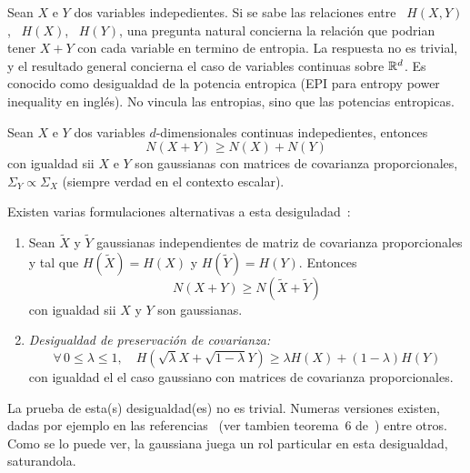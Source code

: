 

Sean $X$  e $Y$ dos variables indepedientes.  Si se sabe las  relaciones entre \
$H(X,Y)$, \ $H(X)$,  \ $H(Y)$, una pregunta natural  concierna la relaci\'on que
podrian tener $X+Y$ con cada variable en termino de entropia. La respuesta no es
trivial, y el  resultado general concierna el caso  de variables continuas sobre
$\mathbb{R}^d$.   Es conocido  como desigualdad  de la  potencia entropica  (EPI para
entropy power  inequality en ingl\'es). No  vincula las entropias,  sino que las
potencias entropicas.
%
\begin{teorema}
  Sean  $X$  e  $Y$  dos variables  $d$-dimensionales  continuas  indepedientes,
  entonces
  \[
  N(X + Y) \ge N(X) + N(Y)
  \]
%
  con  igualdad  sii  $X$  e  $Y$  son gaussianas  con  matrices  de  covarianza
  proporcionales,  $\Sigma_Y \propto  \Sigma_X$ (siempre  verdad en  el contexto
  escalar).
\end{teorema}
%
\noindent     Existen    varias     formulaciones     alternativas    a     esta
desiguladad~\cite{Sha48, Lie78, CovTho06, DemCov91, Rio07}:
%
\begin{enumerate}
\item\label{EPI:SZ:EquivGauss} Sean $\widetilde{X}$ y $\widetilde{Y}$ gaussianas
  independientes   de   matriz   de   covarianza  proporcionales   y   tal   que
  $H(\widetilde{X}) =  H(X)$ y $H(\widetilde{Y}) = H(Y)$.  Entonces
  \[
  N(X+Y) \ge N\left( \widetilde{X} + \widetilde{Y} \right)
  \]
  con igualdad sii $X$ y $Y$ son gaussianas.
%
\item\label{EPI:SZ:PresCov}    {\it    Desigualdad    de    preservaci\'on    de
    covarianza:}
  \[
  \forall  \,   0  \le  \lambda  \le   1,  \quad  H\left(   \sqrt{\lambda}  X  +
    \sqrt{1-\lambda} Y \right) \ge \lambda H(X) + (1-\lambda) H(Y)
  \]
  con igualdad el el caso gaussiano con matrices de covarianza proporcionales.
\end{enumerate}
%

La prueba  de esta(s) desigualdad(es) no es  trivial.  Numeras versiones
existen,  dadas por  ejemplo  en las  referencias~\cite{Bla65, Sta59,  ShaWea64,
  Rio07,  Rio11,  Rio17,  CovTho06,  DemCov91,  Lie78,  VerGuo06}  (ver  tambien
teorema~6  de~\cite{Lie75}) entre  otros.  Como  se lo  puede ver,  la gaussiana
juega un rol particular en esta desigualdad, saturandola.


